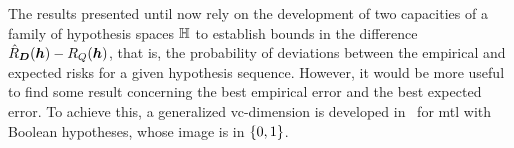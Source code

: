 The results presented until now rely on the development of two capacities of a family of hypothesis spaces $\mathbb{H}$ to establish bounds in the difference $\hat{R}_{\bm{D}}(\bm{h}) - R_Q(\bm{h})$, that is, the probability of deviations between the empirical and expected risks for a given hypothesis sequence. However, it would be more useful to find some result concerning the best empirical error and the {best expected error}.
To achieve this, a generalized \acrshort{vc}-dimension is developed in~\cite{baxter2000model} for \acrshort{mtl} with Boolean hypotheses, whose image is in $\left\{0, 1\right\}$.
%
